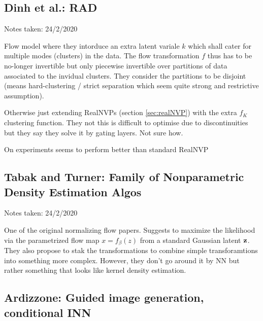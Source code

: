 \subsection{Dinh et al.: RAD}

\begin{notebox}

\hfill Notes taken: 24/2/2020 
\end{notebox}

Flow model where they intorduce an extra latent variale $k$ which shall cater for multiple modes (clusters) in the data. The flow transformation $f$ thus has to be no-longer invertible but only piecewise invertible over partitions of data associated to the invidual clusters. They consider the partitions to be disjoint (means hard-clustering / strict separation which seem quite strong and restrictive assumption). 

Otherwise just extending RealNVPs (section \ref{sec:realNVP}) with the extra $f_K$ clustering function. They not this is difficult to optimise due to discontinuities but they say they solve it by gating layers. Not sure how.

On experiments seems to perform better than standard RealNVP


\subsection{Tabak and Turner: Family of Nonparametric Density Estimation Algos}

\begin{notebox}

\hfill Notes taken: 24/2/2020 
\end{notebox}

One of the original normalizing flow papers.
Suggests to maximize the likelihood via the parametrized flow map $x = f_\beta(z)$ from a standard Gaussian latent $\mathbf{z}$.
They also propose to stak the transformations to combine simple transforamtions into something more complex. However, they don't go around it by NN but rather something that looks like kernel density estimation. 

\subsection{Ardizzone: Guided image generation, conditional INN}

